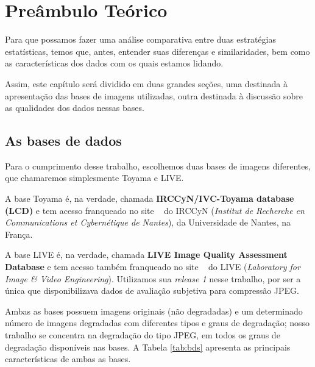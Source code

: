 \chapter{Preâmbulo Teórico}

Para que possamos fazer uma análise comparativa entre duas estratégias estatísticas, temos que, antes, entender suas diferenças e similaridades, bem como as características dos dados com os quais estamos lidando.

Assim, este capítulo será dividido em duas grandes seções, uma destinada à apresentação das bases de imagens utilizadas, outra destinada à discussão sobre as qualidades dos dados nessas bases.

\section{As bases de dados}

Para o cumprimento desse trabalho, escolhemos duas bases de imagens diferentes, que chamaremos simplesmente Toyama e LIVE.

A base Toyama é, na verdade, chamada \textbf{IRCCyN/IVC-Toyama database (LCD)} e tem acesso franqueado no site ~\cite{Tourancheau2008} do IRCCyN (\emph{Institut de Recherche en Communications et Cybernétique de Nantes}), da Universidade de Nantes, na França.

A base LIVE é, na verdade, chamada \textbf{LIVE Image Quality Assessment Database} e tem acesso também franqueado no site ~\cite{livedb} do LIVE (\emph{Laboratory for Image \& Video Engineering}). Utilizamos sua \emph{release 1} nesse trabalho, por ser a única que disponibilizava dados de avaliação subjetiva para compressão JPEG.

Ambas as bases possuem imagens originais (não degradadas) e um determinado número de imagens degradadas com diferentes tipos e graus de degradação; nosso trabalho se concentra na degradação do tipo JPEG, em todos os graus de degradação disponíveis nas bases. A Tabela \ref{tab:bds} apresenta as principais características de ambas as bases. 

